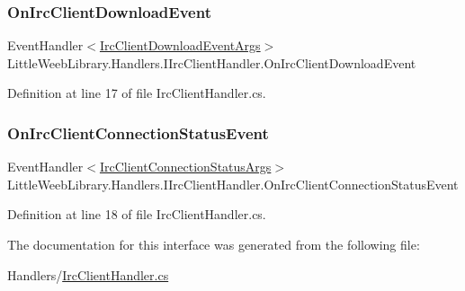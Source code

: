 \subsubsection{\texorpdfstring{On\+Irc\+Client\+Download\+Event}{OnIrcClientDownloadEvent}}
{\footnotesize\ttfamily Event\+Handler$<$\mbox{\hyperlink{class_little_weeb_library_1_1_event_arguments_1_1_irc_client_download_event_args}{Irc\+Client\+Download\+Event\+Args}}$>$ Little\+Weeb\+Library.\+Handlers.\+I\+Irc\+Client\+Handler.\+On\+Irc\+Client\+Download\+Event}



Definition at line 17 of file Irc\+Client\+Handler.\+cs.

\mbox{\label{interface_little_weeb_library_1_1_handlers_1_1_i_irc_client_handler_aa5c6de48e7174db5e954a98bc7f51428}} 
\subsubsection{\texorpdfstring{On\+Irc\+Client\+Connection\+Status\+Event}{OnIrcClientConnectionStatusEvent}}
{\footnotesize\ttfamily Event\+Handler$<$\mbox{\hyperlink{class_little_weeb_library_1_1_event_arguments_1_1_irc_client_connection_status_args}{Irc\+Client\+Connection\+Status\+Args}}$>$ Little\+Weeb\+Library.\+Handlers.\+I\+Irc\+Client\+Handler.\+On\+Irc\+Client\+Connection\+Status\+Event}



Definition at line 18 of file Irc\+Client\+Handler.\+cs.



The documentation for this interface was generated from the following file\+:\begin{DoxyCompactItemize}
\item 
Handlers/\mbox{\hyperlink{_irc_client_handler_8cs}{Irc\+Client\+Handler.\+cs}}\end{DoxyCompactItemize}
